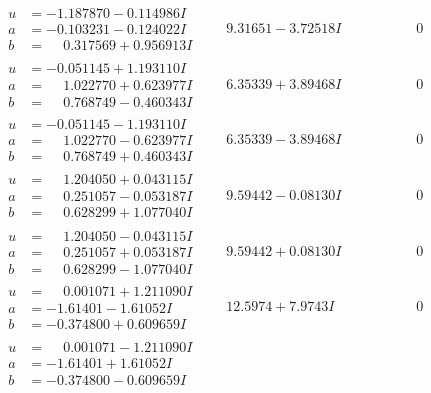 \documentclass[1p]{elsarticle_modified}
\theoremstyle{definition}
\begin{document}
$$\begin{array}{c|c|c}
\begin{aligned}
u &= -1.187870 - 0.114986 I \\
a &= -0.103231 - 0.124022 I \\
b &= \phantom{-}0.317569 + 0.956913 I\end{aligned}
 & \phantom{-}9.31651 - 3.72518 I & \phantom{-0.000000 } 0 \\ \hline\begin{aligned}
u &= -0.051145 + 1.193110 I \\
a &= \phantom{-}1.022770 + 0.623977 I \\
b &= \phantom{-}0.768749 - 0.460343 I\end{aligned}
 & \phantom{-}6.35339 + 3.89468 I & \phantom{-0.000000 } 0 \\ \hline\begin{aligned}
u &= -0.051145 - 1.193110 I \\
a &= \phantom{-}1.022770 - 0.623977 I \\
b &= \phantom{-}0.768749 + 0.460343 I\end{aligned}
 & \phantom{-}6.35339 - 3.89468 I & \phantom{-0.000000 } 0 \\ \hline\begin{aligned}
u &= \phantom{-}1.204050 + 0.043115 I \\
a &= \phantom{-}0.251057 - 0.053187 I \\
b &= \phantom{-}0.628299 + 1.077040 I\end{aligned}
 & \phantom{-}9.59442 - 0.08130 I & \phantom{-0.000000 } 0 \\ \hline\begin{aligned}
u &= \phantom{-}1.204050 - 0.043115 I \\
a &= \phantom{-}0.251057 + 0.053187 I \\
b &= \phantom{-}0.628299 - 1.077040 I\end{aligned}
 & \phantom{-}9.59442 + 0.08130 I & \phantom{-0.000000 } 0 \\ \hline\begin{aligned}
u &= \phantom{-}0.001071 + 1.211090 I \\
a &= -1.61401 - 1.61052 I \\
b &= -0.374800 + 0.609659 I\end{aligned}
 & \phantom{-}12.5974 + 7.9743 I & \phantom{-0.000000 } 0 \\ \hline\begin{aligned}
u &= \phantom{-}0.001071 - 1.211090 I \\
a &= -1.61401 + 1.61052 I \\
b &= -0.374800 - 0.609659 I\end{aligned}

\end{array}$$
\end{document}
